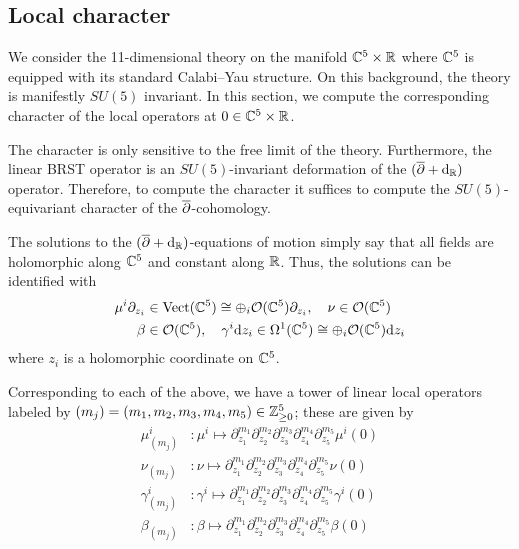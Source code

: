 \documentclass[11pt]{amsart}
\begin{document}
\subsection{Local character}

We consider the 11-dimensional theory on the manifold $\mathbb C^5 \times \mathbb R$ where $\mathbb C^5$ is equipped with its standard Calabi--Yau structure. 
On this background, the theory is manifestly $SU(5)$ invariant. 
In this section, we compute the corresponding character of the local operators at $0 \in \mathbb C^5 \times \mathbb R$. 

The character is only sensitive to the free limit of the theory.
Furthermore, the linear BRST operator is an $SU(5)$-invariant deformation of the $(\overline{\partial} + {\rm d}_{\mathbb R})$ operator. 
Therefore, to compute the character it suffices to compute the $SU(5)$-equivariant character of the $\overline{\partial}$-cohomology. 

The solutions to the $(\overline{\partial} + {\rm d}_{\mathbb R})$-equations of motion simply say that all fields are holomorphic along $\mathbb C^5$ and constant along $\mathbb R$. 
Thus, the solutions can be identified with 
\begin{align*}
\mu^{i}\partial_{z_i} & \in {\rm Vect}(\mathbb C^5) \cong \oplus_i \mathcal O(\mathbb{C}^5)\partial_{z_i},\quad 
\nu \in \mathcal O (\mathbb{C}^5) \\
\beta & \in \mathcal O (\mathbb{C}^5), \quad \gamma^{i} {\rm d} z_i \in \Omega^{1}(\mathbb C^5) \cong \oplus_i \mathcal O (\mathbb{C}^5){\rm d} z_i 
\end{align*}
where $z_i$ is a holomorphic coordinate on $\mathbb C^5$. 

Corresponding to each of the above, we have a tower of linear local operators labeled by $(m_j) = (m_1, m_2, m_3, m_4, m_5)\in \mathbb{Z}^5_{\geq 0}$; these are given by
\begin{align*}
 \mu^{i}_{(m_j)} &: \mu^{i}\mapsto \partial_{z_1}^{m_1}\partial_{z_2}^{m_2}\partial_{z_3}^{m_3}\partial_{z_4}^{m_4}\partial_{z_5}^{m_5}\mu^{i} (0) \\
\nu_{(m_j)} &: \nu\mapsto \partial_{z_1}^{m_1}\partial_{z_2}^{m_2}\partial_{z_3}^{m_3}\partial_{z_4}^{m_4}\partial_{z_5}^{m_5}\nu (0) \\
\gamma^{i}_{(m_j)} &: \gamma^{i}\mapsto \partial_{z_1}^{m_1}\partial_{z_2}^{m_2}\partial_{z_3}^{m_3}\partial_{z_4}^{m_4}\partial_{z_5}^{m_5}\gamma^{i} (0) \\
 \beta_{(m_j)} &: \beta\mapsto \partial_{z_1}^{m_1}\partial_{z_2}^{m_2}\partial_{z_3}^{m_3}\partial_{z_4}^{m_4}\partial_{z_5}^{m_5}\beta (0) \\
\end{align*}
\end{document}
